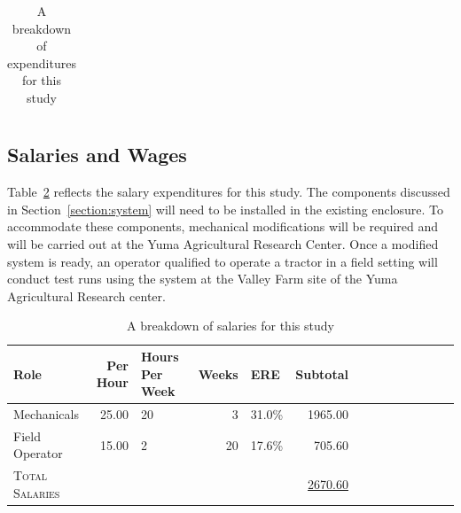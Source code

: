 \documentclass[letterpaper]{article}
\begin{document}
{{\begin{table}[h]
\begin{tabular}{lrlr}
	\bottomrule
    \bottomrule                
\end{tabular}
\caption[Total Budget Breakdown]{A breakdown of expenditures for this study}
\label{table:budget}
\end{table}

%
%
\subsection{Salaries and Wages}
Table~\ref{table:salaries} reflects the salary expenditures for this study.  The components discussed in Section~\ref{section:system} will need to be installed in the existing enclosure. To accommodate these components, mechanical modifications will be required and will be carried out at the Yuma Agricultural Research Center. Once a modified system is ready, an operator qualified to operate a tractor in a field setting will conduct test runs using the system at the Valley Farm site of the Yuma Agricultural Research center.
\begin{table}[H] %
\centering
\begin{tabular}{lrlrlrlrlrlrlr}
 	\toprule
	Role & Per Hour & Hours Per Week & Weeks & ERE & Subtotal \\
	\toprule
	Mechanicals & 25.00 & 20 & 3 & 31.0\% & 1965.00 \\
	Field Operator & 15.00 & 2 & 20 & 17.6\% & 705.60 \\
	\toprule
	\toprule
	\textsc{Total Salaries} & & & & & \underline{2670.60} \\

	\bottomrule
    \bottomrule                
\end{tabular}
\caption[Salary Breakdown]{A breakdown of salaries for this study}
\label{table:salaries}
\end{table}

%
%

}}
\end{document}
